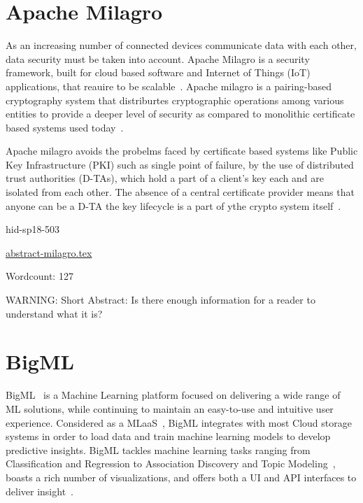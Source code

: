 \section{Apache Milagro}

As an increasing number of connected devices communicate data with
each other, data security must be taken into account. Apache Milagro
is a security framework, built for cloud based software and Internet
of Things (IoT) applications, that reauire to be
scalable~\cite{hid-sp18-503-www-milagro}. Apache milagro is a
pairing-based cryptography system that distriburtes cryptographic
operations among various entities to provide a deeper level of
security as compared to monolithic certificate based systems used
today~\cite{hid-sp18-503-www-milagro-docs}.

Apache milagro avoids the probelms faced by certificate based systems
like Public Key Infrastructure (PKI) such as single point of failure,
by the use of distributed trust authorities (D-TAs), which hold a part
of a client's key each and are isolated from each other. The absence
of a central certificate provider means that anyone can be a D-TA the
key lifecycle is a part of ythe crypto system
itself~\cite{hid-sp18-503-www-milagro-docs}.


\begin{IU}

hid-sp18-503

\href{https://github.com/cloudmesh-community/hid-sp18-503/blob/master//technology/abstract-milagro.tex}{abstract-milagro.tex}

 

Wordcount: 127

WARNING: Short Abstract: Is there enough information for a reader to understand what it is?

\end{IU}

\section{BigML}

BigML~\cite{hid-sp18-504-cloudacad-bigml} is a Machine Learning platform
focused on delivering a wide range of ML solutions, while continuing to 
maintain an easy-to-use and intuitive user experience. Considered as 
a MLaaS~\cite{hid-sp18-504-cloudacad-bigml}, BigML integrates with most 
Cloud storage systems in order to load data and train machine learning 
models to develop predictive insights. BigML tackles machine learning tasks 
ranging from Classification and Regression to Association Discovery and 
Topic Modeling~\cite{hid-sp18-504-bigml}, boasts a rich number of 
visualizations, and offers both a UI and API interfaces to deliver 
insight~\cite{hid-sp18-504-cloudacad-bigml}.


